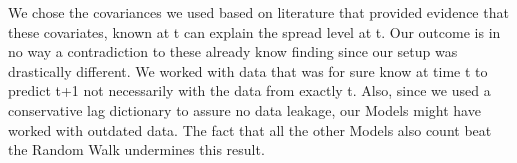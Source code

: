 %
%
%
We chose the covariances we used based on literature that provided evidence that these covariates, known at t can explain the spread level at t. Our outcome is in no way a contradiction to these already know finding since our setup was drastically different. We worked with data that was for sure know at time t to predict t+1 not necessarily with the data from exactly t. Also, since we used a conservative lag dictionary to assure no data leakage, our Models might have worked with outdated data. The fact that all the other Models also count beat the Random Walk undermines this result.
